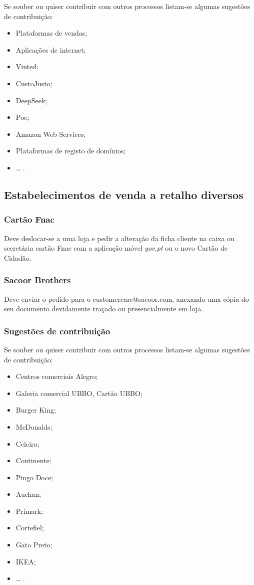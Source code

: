 Se souber ou quiser contribuir com outros processos listam-se algumas
sugestões de contribuição:
\begin{itemize}
	\item Plataformas de vendas;
	\item Aplicações de internet;
	\item Vinted;
	\item CustoJusto;
	\item DeepSeek;
	\item Poe;
	\item Amazon Web Services;
	\item Plataformas de registo de domínios;
	\item \ldots{} .
\end{itemize}

\subsection{Estabelecimentos de venda a retalho diversos}

\subsubsection{Cartão Fnac}

Deve deslocar-se a uma loja e pedir a alteração da ficha cliente na
caixa ou secretária cartão Fnac com a aplicação móvel \emph{gov.pt} ou o
novo Cartão de Cidadão.

\subsubsection{Sacoor Brothers}

Deve enviar o pedido para o customercare@sacoor.com, anexando uma cópia
do seu documento devidamente traçado ou presencialmente em loja.

\subsubsection{Sugestões de contribuição}

Se souber ou quiser contribuir com outros processos listam-se algumas
sugestões de contribuição:
\begin{itemize}
	\item Centros comerciais Alegro;
	\item Galeria comercial UBBO, Cartão UBBO;
	\item Burger King;
	\item McDonalds;
	\item Celeiro;
	\item Continente;
	\item Pingo Doce;
	\item Auchan;
	\item Primark;
	\item Cortefiel;
	\item Gato Preto;
	\item IKEA;
	\item \ldots{} .
\end{itemize}

